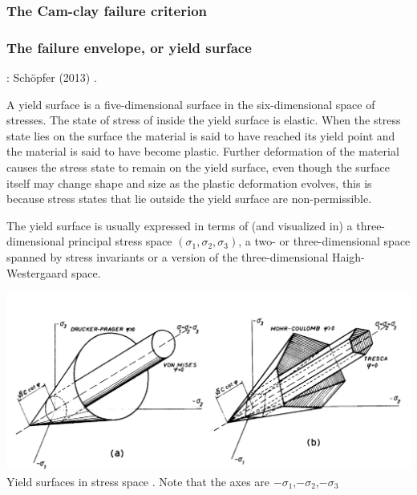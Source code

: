 \subsubsection{The Cam-clay failure criterion}



\subsubsection{The failure envelope, or yield surface}
\label{ss:envelope} 

\Literature: Sch{\"o}pfer \etal (2013) \cite{sccm13}.

A yield surface is a five-dimensional surface in the six-dimensional space of stresses. 
The state of stress of inside the yield surface is elastic. 
When the stress state lies on the surface the material is said to have reached its yield point 
and the material is said to have become plastic. Further deformation of the material causes 
the stress state to remain on the yield surface, even though the surface itself may change shape and 
size as the plastic deformation evolves, this is because stress states that lie outside the yield surface are non-permissible.

The yield surface is usually expressed in terms of (and visualized in) a three-dimensional principal stress space $(\sigma_1,\sigma_2,\sigma_3)$, a two- or three-dimensional space spanned by stress invariants 
or a version of the three-dimensional Haigh-Westergaard space. 

\begin{center}
\includegraphics[width=14cm]{images/rheology/surfaces}\\
{\captionfont Yield surfaces in stress space \cite{zico74}. Note that 
the axes are $-\sigma_1$,$-\sigma_2$,$-\sigma_3$}
\end{center} 

